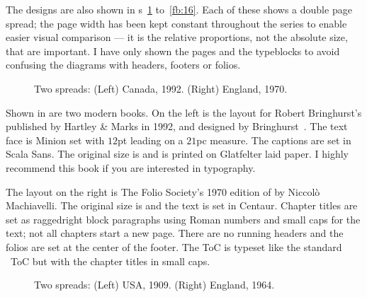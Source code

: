 \documentclass[10pt,letterpaper,extrafontsizes]{memoir}
\begin{document}
    The designs are also shown in \figurerefname s~\ref{fb:1} 
to~\ref{fb:16}. Each of these shows a double page spread; the 
page width has been kept constant throughout the series to enable easier
visual comparison --- it is the relative proportions, not the absolute size, 
that are important. I have only shown the pages and the typeblocks to avoid
confusing the diagrams with headers, footers 
or folios.


\begin{figure}
\centering
\begin{minipage}[b]{\pwlayi}
\end{minipage}
\hfill
\begin{minipage}[b]{\pwlayi}
\end{minipage}
\caption[Two spreads: Canada, 1992 and England, 1970]%
        {Two spreads: (Left) Canada, 1992. %
         (Right) England, 1970.} \label{fb:1}
\end{figure}

    Shown in  are two modern books. On the left is the layout
for Robert Bringhurst's 
 published
by Hartley \& Marks in 1992, and designed by Bringhurst~\autocite{BRINGHURST99}. 
The text face is
Minion set with $12$pt leading on a $21$pc measure. 
The captions are set in Scala Sans. The original
size is  and is printed on Glatfelter laid 
paper. 
I highly recommend this book if you are
interested in typography. 

The layout on the right is The Folio Society's
1970 edition of  by Niccol\`{o} Machiavelli. The original
size is  and the text is set in  
Centaur.
Chapter titles are set as raggedright block 
paragraphs using Roman numbers
and small caps for the text; not all chapters start a new page. There are
no running headers and the folios 
are set at the center of the footer.
The ToC is typeset like the standard \ltx\ ToC 
but with the chapter titles
in small caps.



\begin{figure}
\centering
\begin{minipage}[b]{\pwlayi}
\end{minipage}
\hfill
\begin{minipage}[b]{\pwlayi}
\end{minipage}
\caption[Two spreads: USA, 1909 and England, 1964.]%
        {Two spreads: (Left) USA, 1909.
         (Right) England, 1964.} \label{fb:2}
\end{figure}
\end{document}
